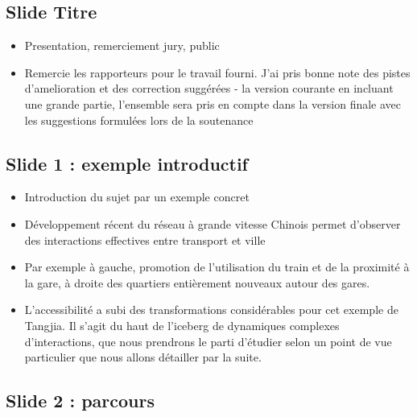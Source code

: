 \documentclass[11pt]{article}
\begin{document}
\subsection*{Slide Titre}

\begin{itemize}
	\item Presentation, remerciement jury, public
	\item Remercie les rapporteurs pour le travail fourni. J'ai pris bonne note des pistes d'amelioration et des correction suggérées - la version courante en incluant une grande partie, l'ensemble sera pris en compte dans la version finale avec les suggestions formulées lors de la soutenance
\end{itemize}



\subsection*{Slide 1 : exemple introductif}

\begin{itemize}
	\item Introduction du sujet par un exemple concret
	\item Développement récent du réseau à grande vitesse Chinois permet d'observer des interactions effectives entre transport et ville
	\item Par exemple à gauche, promotion de l'utilisation du train et de la proximité à la gare, à droite des quartiers entièrement nouveaux autour des gares.
	\item L'accessibilité a subi des transformations considérables pour cet exemple de Tangjia. Il s'agit du haut de l'iceberg de dynamiques complexes d'interactions, que nous prendrons le parti d'étudier selon un point de vue particulier que nous allons détailler par la suite.
\end{itemize}


\subsection*{Slide 2 : parcours}
\end{document}
